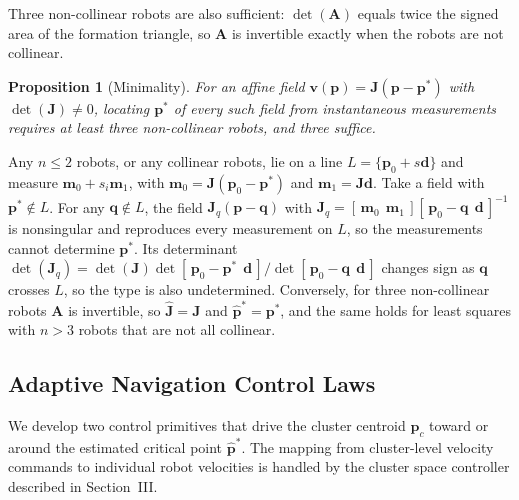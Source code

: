 \documentclass[lettersize,journal]{IEEEtran}
\newtheorem{proposition}{Proposition}
\begin{document}
Three non-collinear robots are also sufficient: $\det(\mathbf{A})$ equals twice the signed area of the formation triangle, so $\mathbf{A}$ is invertible exactly when the robots are not collinear.

\begin{proposition}[Minimality]\label{prop:min}
For an affine field $\mathbf{v}(\mathbf{p}) = \mathbf{J}(\mathbf{p}-\mathbf{p}^*)$ with $\det(\mathbf{J}) \neq 0$, locating $\mathbf{p}^*$ of every such field from instantaneous measurements requires at least three non-collinear robots, and three suffice.
\end{proposition}

\begin{IEEEproof}
Any $n \le 2$ robots, or any collinear robots, lie on a line $L = \{\mathbf{p}_0 + s\mathbf{d}\}$ and measure $\mathbf{m}_0 + s_i\mathbf{m}_1$, with $\mathbf{m}_0 = \mathbf{J}(\mathbf{p}_0 - \mathbf{p}^*)$ and $\mathbf{m}_1 = \mathbf{J}\mathbf{d}$. Take a field with $\mathbf{p}^* \notin L$. For any $\mathbf{q} \notin L$, the field $\mathbf{J}_q(\mathbf{p} - \mathbf{q})$ with $\mathbf{J}_q = [\,\mathbf{m}_0\ \ \mathbf{m}_1\,][\,\mathbf{p}_0 - \mathbf{q}\ \ \mathbf{d}\,]^{-1}$ is nonsingular and reproduces every measurement on $L$, so the measurements cannot determine $\mathbf{p}^*$. Its determinant $\det(\mathbf{J}_q) = \det(\mathbf{J})\det[\,\mathbf{p}_0 - \mathbf{p}^*\ \ \mathbf{d}\,]/\det[\,\mathbf{p}_0 - \mathbf{q}\ \ \mathbf{d}\,]$ changes sign as $\mathbf{q}$ crosses $L$, so the type is also undetermined. Conversely, for three non-collinear robots $\mathbf{A}$ is invertible, so $\hat{\mathbf{J}} = \mathbf{J}$ and $\hat{\mathbf{p}}^* = \mathbf{p}^*$, and the same holds for least squares with $n > 3$ robots that are not all collinear.
\end{IEEEproof}


\subsection{Adaptive Navigation Control Laws}
\label{sec:control_primitives}

We develop two control primitives that drive the cluster centroid $\mathbf{p}_c$ toward or around the estimated critical point $\hat{\mathbf{p}}^*$. The mapping from cluster-level velocity commands to individual robot velocities is handled by the cluster space controller described in Section~III.
\end{document}
